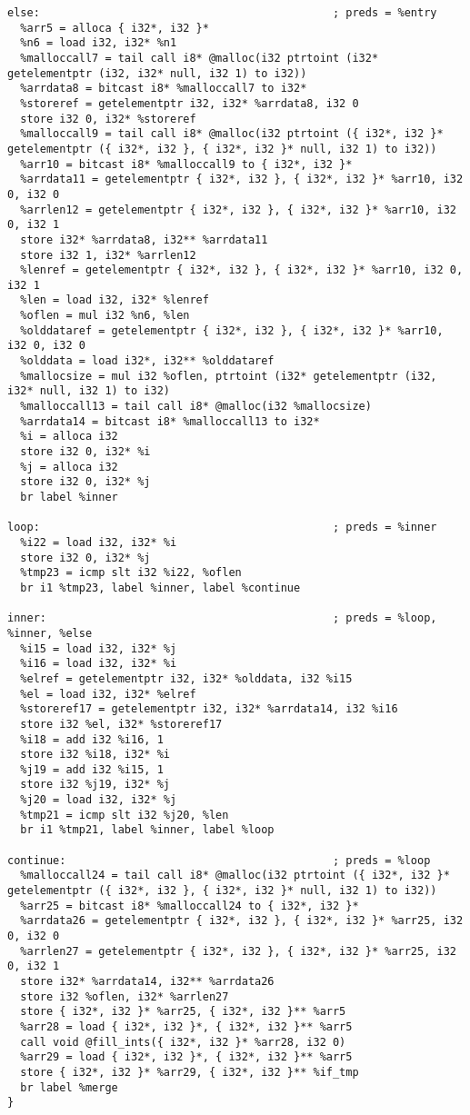 \documentclass[main.tex]{subfiles}
\begin{document}
{\begin{lstlisting}
else:                                             ; preds = %entry
  %arr5 = alloca { i32*, i32 }*
  %n6 = load i32, i32* %n1
  %malloccall7 = tail call i8* @malloc(i32 ptrtoint (i32* getelementptr (i32, i32* null, i32 1) to i32))
  %arrdata8 = bitcast i8* %malloccall7 to i32*
  %storeref = getelementptr i32, i32* %arrdata8, i32 0
  store i32 0, i32* %storeref
  %malloccall9 = tail call i8* @malloc(i32 ptrtoint ({ i32*, i32 }* getelementptr ({ i32*, i32 }, { i32*, i32 }* null, i32 1) to i32))
  %arr10 = bitcast i8* %malloccall9 to { i32*, i32 }*
  %arrdata11 = getelementptr { i32*, i32 }, { i32*, i32 }* %arr10, i32 0, i32 0
  %arrlen12 = getelementptr { i32*, i32 }, { i32*, i32 }* %arr10, i32 0, i32 1
  store i32* %arrdata8, i32** %arrdata11
  store i32 1, i32* %arrlen12
  %lenref = getelementptr { i32*, i32 }, { i32*, i32 }* %arr10, i32 0, i32 1
  %len = load i32, i32* %lenref
  %oflen = mul i32 %n6, %len
  %olddataref = getelementptr { i32*, i32 }, { i32*, i32 }* %arr10, i32 0, i32 0
  %olddata = load i32*, i32** %olddataref
  %mallocsize = mul i32 %oflen, ptrtoint (i32* getelementptr (i32, i32* null, i32 1) to i32)
  %malloccall13 = tail call i8* @malloc(i32 %mallocsize)
  %arrdata14 = bitcast i8* %malloccall13 to i32*
  %i = alloca i32
  store i32 0, i32* %i
  %j = alloca i32
  store i32 0, i32* %j
  br label %inner

loop:                                             ; preds = %inner
  %i22 = load i32, i32* %i
  store i32 0, i32* %j
  %tmp23 = icmp slt i32 %i22, %oflen
  br i1 %tmp23, label %inner, label %continue

inner:                                            ; preds = %loop, %inner, %else
  %i15 = load i32, i32* %j
  %i16 = load i32, i32* %i
  %elref = getelementptr i32, i32* %olddata, i32 %i15
  %el = load i32, i32* %elref
  %storeref17 = getelementptr i32, i32* %arrdata14, i32 %i16
  store i32 %el, i32* %storeref17
  %i18 = add i32 %i16, 1
  store i32 %i18, i32* %i
  %j19 = add i32 %i15, 1
  store i32 %j19, i32* %j
  %j20 = load i32, i32* %j
  %tmp21 = icmp slt i32 %j20, %len
  br i1 %tmp21, label %inner, label %loop

continue:                                         ; preds = %loop
  %malloccall24 = tail call i8* @malloc(i32 ptrtoint ({ i32*, i32 }* getelementptr ({ i32*, i32 }, { i32*, i32 }* null, i32 1) to i32))
  %arr25 = bitcast i8* %malloccall24 to { i32*, i32 }*
  %arrdata26 = getelementptr { i32*, i32 }, { i32*, i32 }* %arr25, i32 0, i32 0
  %arrlen27 = getelementptr { i32*, i32 }, { i32*, i32 }* %arr25, i32 0, i32 1
  store i32* %arrdata14, i32** %arrdata26
  store i32 %oflen, i32* %arrlen27
  store { i32*, i32 }* %arr25, { i32*, i32 }** %arr5
  %arr28 = load { i32*, i32 }*, { i32*, i32 }** %arr5
  call void @fill_ints({ i32*, i32 }* %arr28, i32 0)
  %arr29 = load { i32*, i32 }*, { i32*, i32 }** %arr5
  store { i32*, i32 }* %arr29, { i32*, i32 }** %if_tmp
  br label %merge
}


\end{lstlisting}}
\end{document}
